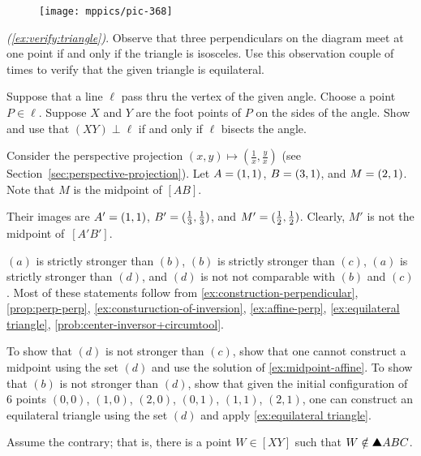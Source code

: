 \begin{multicols}{2}
{\begin{wrapfigure}{r}{21mm}
\vskip-6mm
\centering
\texttt{[image: mppics/pic-368]}
\end{wrapfigure}

\parbf{\ref{ex:equilateral triangle-verify},} \textit{(\ref{ex:verify:triangle})}.
Observe that three perpendiculars on the diagram meet at one point if and only if the triangle is isosceles.
Use this observation couple of times to verify that the given triangle is equilateral.

Suppose that a line $\ell$ pass thru the vertex of the given angle.
Choose a point $P\in \ell$.
Suppose $X$ and $Y$ are the foot points of $P$ on the sides of the angle.
Show and use that $(XY)\perp \ell$ if and only if $\ell$ bisects the angle.

}

Consider the perspective projection 
$(x,y)\mapsto (\tfrac 1x,\tfrac yx)$ (see Section~\ref{sec:perspective-projection}).
Let $A\z=(1,1)$, $B\z=(3,1)$, and $M\z=(2,1)$.
Note that $M$ is the midpoint of $[AB]$.

Their images are $A'\z=(1,1)$, $B'\z=(\tfrac13,\tfrac13)$, and $M'\z=(\tfrac12,\tfrac12)$.
Clearly, $M'$ is not the midpoint of~$[A'B']$.


$(a)$ is strictly stronger than $(b)$,
$(b)$ is strictly stronger than $(c)$,
$(a)$ is strictly stronger than $(d)$,
and $(d)$ is not not comparable with $(b)$ and $(c)$.
Most of these statements follow from \ref{ex:construction-perpendicular},
\ref{prop:perp-perp},
\ref{ex:consturuction-of-inversion},
\ref{ex:affine-perp},
\ref{ex:equilateral triangle}, 
\ref{prob:center-inversor+circumtool}.

To show that $(d)$ is not stronger than $(c)$, show that one cannot construct a midpoint using the set $(d)$ and use the solution of \ref{ex:midpoint-affine}.
To show that $(b)$ is not stronger than $(d)$, show that given the initial configuration of 6 points 
$(0,0)$, 
$(1,0)$,
$(2,0)$,
$(0,1)$, 
$(1,1)$,
$(2,1)$,
one can construct an equilateral triangle using the set $(d)$ and apply \ref{ex:equilateral triangle}.

\setcounter{eqtn}{0} 

Assume the contrary; 
that is, there is a point $W\in [XY]$ such that $W\notin\solidtriangle ABC$.




\end{multicols}
